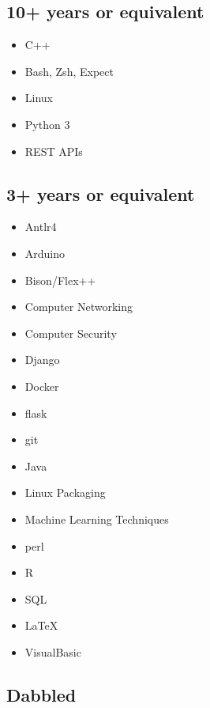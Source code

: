 \documentclass[10pt,a4paper,sans]{moderncv}        %
\begin{document}
\subsection{10+ years or equivalent}

\begin{multicols}{3}
\begin{itemize}

\item C++
\item Bash, Zsh, Expect
\item Linux
\item Python 3
\item REST APIs

\end{itemize}
\end{multicols}

\subsection{3+ years or equivalent}

\begin{multicols}{3}
\begin{itemize}

\item Antlr4 
\item Arduino
\item Bison/Flex++
\item Computer Networking
\item Computer Security
\item Django
\item Docker
\item flask
\item git
\item Java
\item Linux Packaging
\item Machine Learning Techniques
\item perl
\item R
\item SQL
\item { \selectfont  \LaTeX }
\item VisualBasic

\end{itemize}
\end{multicols}

\subsection{Dabbled}
\end{document}
